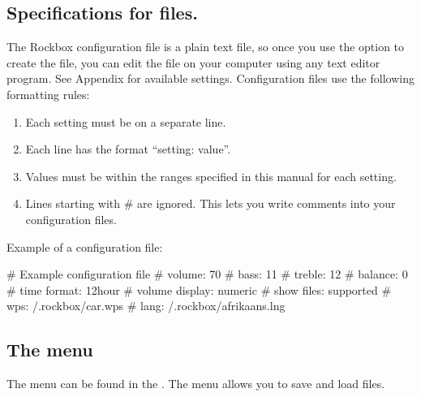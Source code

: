\subsection{\label{ref:cfg_specs}Specifications for 
  files.}

The Rockbox configuration file is a plain text file, so once you use the 
 option to create the file, you can edit the file on 
your computer using any text editor program. See 
Appendix  for available settings. Configuration 
files use the following formatting rules: %

\begin{enumerate} 
\item Each setting must be on a separate line. 
\item Each line has the format ``setting: value''. 
\item Values must be within the ranges specified in this manual for each 
  setting. 
\item Lines starting with \# are ignored. This lets you write comments into 
  your configuration files. 
\end{enumerate}

Example of a configuration file:
\begin{example}
  # Example configuration file
  # volume: 70
  # bass: 11
  # treble: 12
  # balance: 0
  # time format: 12hour
  # volume display: numeric
  # show files: supported
  # wps: /.rockbox/car.wps
  # lang: /.rockbox/afrikaans.lng
\end{example}


\subsection{\label{ref:manage_settings_menu}The  
  menu} The  menu can be found in the . The  menu allows you to save and load 
 files.  

